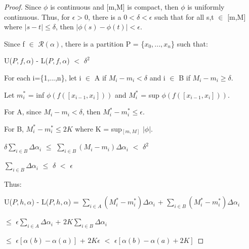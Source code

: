     \begin{proof}
        Since $\phi$ is continuous and [m,M] is compact, then $\phi$
        is uniformly continuous.
        Thus, for $\epsilon > 0$, there is a $0 < \delta < \epsilon$ such that
        for all s,t $\in$ [m,M] where $|s-t| \leq \delta$, then
        $|\phi(s) - \phi(t)| < \epsilon$.
        
        Since f $\in$ $\mathscr{R}(\alpha)$, there is a partition P
        = \{$x_0,...,x_n$\} such that:
        
        \hspace{0.5cm}
        U($P,f,\alpha$) - L($P,f,\alpha$) $<$ $\delta^2$

        For each i=\{1,...,n\}, let i $\in$ A if $M_i - m_i < \delta$
        and i $\in$ B if $M_i - m_i \geq \delta$.

        Let $m_i^*$ = inf $\phi(f([x_{i-1},x_i]))$
        and $M_i^*$ = sup $\phi(f([x_{i-1},x_i]))$.

        For A, since $M_i - m_i < \delta$, then
        $M_i^* - m_i^* \leq \epsilon$.

        For B, $M_i^* - m_i^* \leq 2K$ where K = sup$_{[m,M]}$ $|\phi|$.

        \hspace{0.5cm}
        $\delta \sum_{i \in B} \Delta \alpha_i$
        $\leq$ $\sum_{i \in B} (M_i - m_i) \Delta \alpha_i$
        $<$ $\delta^2$

        \hspace{0.5cm}
        $\sum_{i \in B} \Delta \alpha_i$ $\leq$ $\delta$ $<$ $\epsilon$

        Thus:

        \hspace{0.5cm}
        U($P,h,\alpha$) - L($P,h,\alpha$)
        = $\sum_{i \in A} (M_i^* - m_i^*) \Delta \alpha_i$
            + $\sum_{i \in B} (M_i^* - m_i^*) \Delta \alpha_i$

        \hspace{4.5cm}
        $\leq$ $\epsilon \sum_{i \in A} \Delta \alpha_i$
                + $2K \sum_{i \in B} \Delta \alpha_i$
        
        \hspace{4.5cm}
        $\leq$ $\epsilon[\alpha(b) - \alpha(a)]$
                + $2K \epsilon$
        $<$ $\epsilon[\alpha(b) - \alpha(a) + 2K]$
    \end{proof}

    \vspace{0.5cm}





